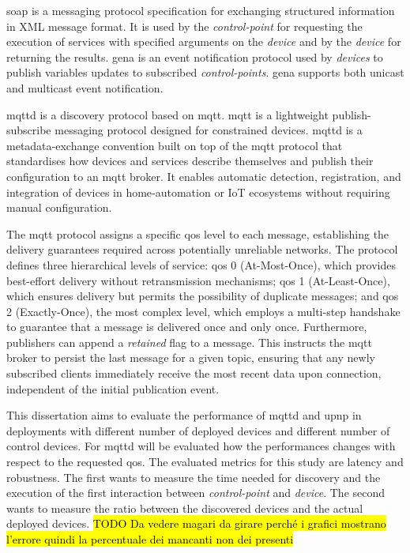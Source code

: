\documentclass[lettersize,journal]{IEEEtran}
\begin{document}
\gls{soap} is a messaging protocol specification for exchanging structured information in XML message format. It is used by the \textit{control-point} for requesting the execution of services with specified arguments on the \textit{device} and by the \textit{device} for returning the results.
\gls{gena} is an event notification protocol used by \textit{devices} to publish variables updates to subscribed \textit{control-points}. \gls{gena} supports both unicast and multicast event notification.

\gls{mqttd} is a discovery protocol based on \gls{mqtt}. \gls{mqtt} is a lightweight publish-subscribe messaging protocol designed for constrained devices. \gls{mqttd} is a metadata‑exchange convention built on top of the \gls{mqtt} protocol that standardises how devices and services describe themselves and publish their configuration to an \gls{mqtt} broker. It enables automatic detection, registration, and integration of devices in home‑automation or IoT ecosystems without requiring manual configuration.

The \gls{mqtt} protocol assigns a specific \gls{qos} level to each message, establishing the delivery guarantees required across potentially unreliable networks. The protocol defines three hierarchical levels of service: \gls{qos} 0 (At-Most-Once), which provides best-effort delivery without retransmission mechanisms; \gls{qos} 1 (At-Least-Once), which ensures delivery but permits the possibility of duplicate messages; and \gls{qos} 2 (Exactly-Once), the most complex level, which employs a multi-step handshake to guarantee that a message is delivered once and only once. Furthermore, publishers can append a \textit{retained} flag to a message. This instructs the \gls{mqtt} broker to persist the last message for a given topic, ensuring that any newly subscribed clients immediately receive the most recent data upon connection, independent of the initial publication event.

This dissertation aims to evaluate the performance of \gls{mqttd} and \gls{upnp} in deployments with different number of deployed devices and different number of control devices. For \gls{mqttd} will be evaluated how the performances changes with respect to the requested \gls{qos}.
The evaluated metrics for this study are latency and robustness. The first wants to measure the time needed for discovery and the execution of the first interaction between \textit{control-point} and \textit{device}. The second wants to measure the ratio between the discovered devices and the actual deployed devices. \textcolor{blue}{\hl{TODO Da vedere magari da girare perché i grafici mostrano l'errore quindi la percentuale dei mancanti non dei presenti}}
\end{document}
